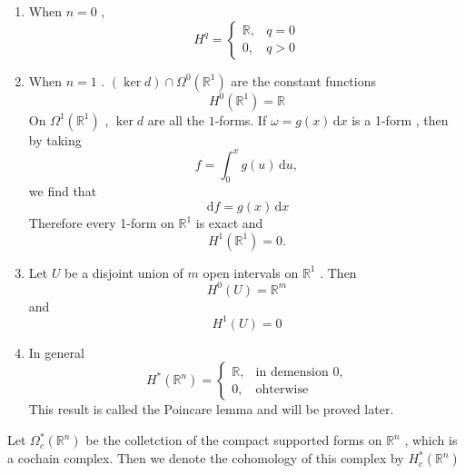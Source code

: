 \documentclass[../main.tex]{subfiles}
\begin{document}
\begin{example}{}{}
    \begin{enumerate}
        \item  When \(  n = 0  \) , \[
        H^{q}= \begin{cases} \mathbb{R} ,&q= 0\\ 
         0,&q> 0 \end{cases} 
        \] 
        \item When \(  n = 1  \) .  \(  \left( \operatorname{ker} d \right)\cap   \Omega ^{0}\left( \mathbb{R} ^{1} \right)    \) are the constant functions \[
        H^{0}\left( \mathbb{R} ^{1} \right)= \mathbb{R}  
        \]  On \(   \Omega ^{1}\left( \mathbb{R} ^{1} \right)    \) , \(  \operatorname{ker}d  \) are all the \(  1  \)-forms. If \(   \omega = g\left( x \right)\,\mathrm{d} x   \) is a 1-form , then by taking \[
        f= \int_{0}^{x}g\left( u \right)\,\mathrm{d}u ,  
        \] we find that \[
        \,\mathrm{d} f= g\left( x \right)\,\mathrm{d} x 
        \] Therefore every 1-form on \(  \mathbb{R} ^{1}  \) is exact and \[
        H^{1}\left( \mathbb{R} ^{1} \right)= 0.  
        \]
        \item Let \(  U  \) be a disjoint union of \(  m  \) open intervals on \(  \mathbb{R} ^{1}  \) .  Then \[
        H^{0}\left( U \right)= \mathbb{R} ^{m} 
        \] and \[
        H^{1}\left( U \right)= 0 
        \] 
        \item In general \[
        H^{*}\left( \mathbb{R} ^{n} \right)= \begin{cases} \mathbb{R} ,& \text{in demension 0},\\
        0,& \text{ohterwise} \end{cases}  
        \]This result is called the Poincare lemma and will be proved  later.         
    \end{enumerate}
    
\end{example}



\begin{definition}{}{}
    Let \(   \Omega ^{*}_{c}\left( \mathbb{R} ^{n} \right)   \) be the colletction of the compact supported forms on \(  \mathbb{R} ^{n}  \) , which is a cochain complex.  Then we denote the cohomology  of this complex by \(  H_{c}^{*}\left( \mathbb{R} ^{n} \right)   \) 
\end{definition}
\end{document}
